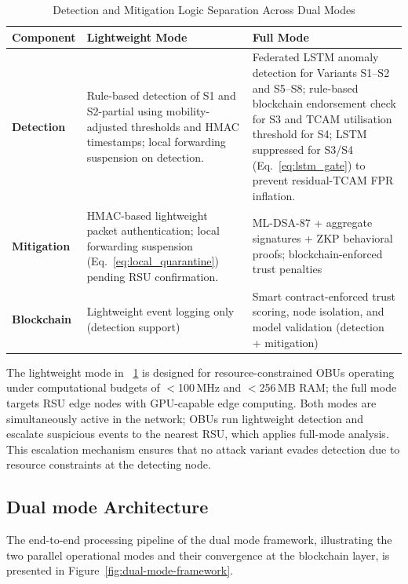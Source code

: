 \documentclass[12pt, a4paper]{report}
\begin{document}
\begin{table}[H]
\centering
\caption{Detection and Mitigation Logic Separation Across Dual Modes}
\label{tab:dm_separation}
\renewcommand{\arraystretch}{1.1}
\footnotesize
\begin{tabular}{|p{2.8cm}|p{2.8cm}|p{2.8cm}|}
\hline
\textbf{Component} & \textbf{Lightweight Mode} & \textbf{Full Mode} \\
\hline
\textbf{Detection} 
& Rule-based detection of S1 and S2-partial using
mobility-adjusted thresholds and \ac{HMAC} timestamps;
local forwarding suspension on detection.

& Federated \ac{LSTM} anomaly detection for
  Variants S1--S2 and S5--S8; rule-based blockchain
  endorsement check for S3 and \ac{TCAM} utilisation
  threshold for S4; \ac{LSTM} suppressed for S3/S4
  (Eq.~\ref{eq:lstm_gate}) to prevent residual-TCAM
  \ac{FPR} inflation. \\

\hline
\textbf{Mitigation} 
& \ac{HMAC}-based lightweight packet authentication;
local forwarding suspension (Eq.~\ref{eq:local_quarantine})
pending \ac{RSU} confirmation.

& ML-DSA-87 + aggregate signatures + ZKP behavioral proofs; blockchain-enforced trust penalties \\
\hline
\textbf{Blockchain} 
& Lightweight event logging only (detection support) 
& Smart contract-enforced trust scoring, node isolation, and model validation (detection + mitigation) \\
\hline
\end{tabular}
\end{table}



The lightweight mode in ~\ref{tab:dm_separation} is designed for resource-constrained OBUs operating
under computational budgets of $<$100\,MHz and $<$256\,MB RAM; the full
mode targets RSU edge nodes with GPU-capable edge computing. Both modes
are simultaneously active in the network; OBUs run lightweight detection
and escalate suspicious events to the nearest RSU, which applies full-mode
analysis. This escalation mechanism ensures that no attack variant evades
detection due to resource constraints at the detecting node.

\subsection{Dual mode Architecture}
\label{sec:dual_mode}
The end-to-end processing pipeline of the dual mode framework, illustrating the two
parallel operational modes and their convergence at the blockchain layer,
is presented in Figure~\ref{fig:dual-mode-framework}.
\end{document}
